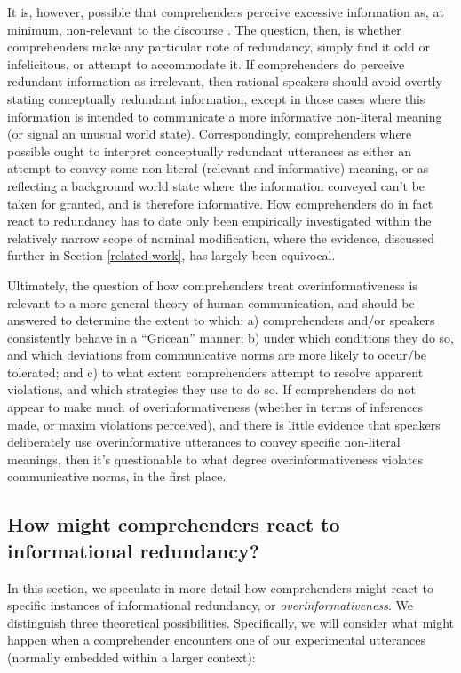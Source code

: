It is, however, possible that comprehenders perceive excessive
information as, at minimum, non-relevant to the discourse \citep{Grice1975,
Horn1984}. The question, then, is whether comprehenders make any
particular note of redundancy, simply find it odd or infelicitous, or
attempt to accommodate it. If comprehenders do perceive redundant
information as irrelevant, then rational speakers should avoid overtly
stating conceptually redundant information, except in those cases where
this information is intended to communicate a more informative
non-literal meaning (or signal an unusual world state). Correspondingly,
comprehenders where possible ought to interpret conceptually redundant
utterances as either an attempt to convey some non-literal (relevant and
informative) meaning, or as reflecting a background world state where
the information conveyed can't be taken for granted, and is therefore
informative. How comprehenders do in fact react to redundancy has to
date only been empirically investigated within the relatively narrow
scope of nominal modification, where the evidence, discussed further in
Section \ref{related-work}, has largely been equivocal.

Ultimately, the question of how comprehenders treat overinformativeness
is relevant to a more general theory of human communication, and should
be answered to determine the extent to which: a) comprehenders and/or
speakers consistently behave in a \enquote{Gricean} manner; b) under
which conditions they do so, and which deviations from communicative
norms are more likely to occur/be tolerated; and c) to what extent
comprehenders attempt to resolve apparent violations, and which
strategies they use to do so. If comprehenders do not appear to make
much of overinformativeness (whether in terms of inferences made, or
maxim violations perceived), and there is little evidence that speakers
deliberately use overinformative utterances to convey specific
non-literal meanings, then it's questionable to what degree
overinformativeness violates communicative norms, in the first place.

\subsection{How might comprehenders react to informational redundancy? }\label{how-might-comprehenders-react-to-informational-redundancy}

In this section, we speculate in more detail how comprehenders might
react to specific instances of informational redundancy, or
\emph{overinformativeness}. We distinguish three theoretical
possibilities. Specifically, we will consider what might happen when a
comprehender encounters one of our experimental utterances (normally
embedded within a larger context):

